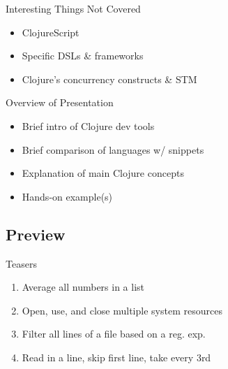 \documentclass{beamer}
\begin{document}
\begin{frame}{Interesting Things Not Covered}
	\begin{itemize}
	\item ClojureScript
	\item Specific DSLs \& frameworks
        \item Clojure's concurrency constructs \& STM
	\end{itemize}	 
\end{frame}

\begin{frame}{Overview of Presentation}
	\begin{itemize}
        \item Brief intro of Clojure dev tools
	\item Brief comparison of languages w/ snippets
        \item Explanation of main Clojure concepts
        \item Hands-on example(s)
	\end{itemize}	 
\end{frame}

\subsection{Preview}

\begin{frame}{Teasers}
	\begin{enumerate}[<+->]
	\item Average all numbers in a list
	\item Open, use, and close multiple system resources
	\item Filter all lines of a file based on a reg. exp.
	\item Read in a line, skip first line, take every 3rd	
	\end{enumerate}
\end{frame}
\end{document}

